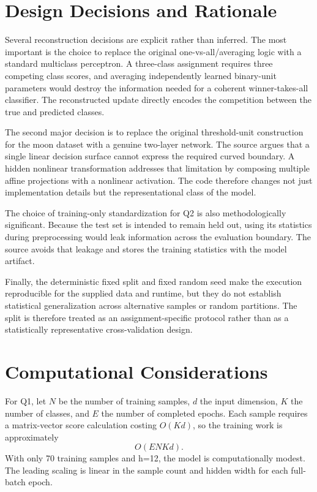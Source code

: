 \documentclass[11pt,a4paper]{article}
\begin{document}
\section{Design Decisions and Rationale}
Several reconstruction decisions are explicit rather than inferred. The most important is the choice to replace the original one-vs-all/averaging logic with a standard multiclass perceptron. A three-class assignment requires three competing class scores, and averaging independently learned binary-unit parameters would destroy the information needed for a coherent winner-takes-all classifier. The reconstructed update directly encodes the competition between the true and predicted classes.

The second major decision is to replace the original threshold-unit construction for the moon dataset with a genuine two-layer network. The source argues that a single linear decision surface cannot express the required curved boundary. A hidden nonlinear transformation addresses that limitation by composing multiple affine projections with a nonlinear activation. The code therefore changes not just implementation details but the representational class of the model.

The choice of training-only standardization for Q2 is also methodologically significant. Because the test set is intended to remain held out, using its statistics during preprocessing would leak information across the evaluation boundary. The source avoids that leakage and stores the training statistics with the model artifact.

Finally, the deterministic fixed split and fixed random seed make the execution reproducible for the supplied data and runtime, but they do not establish statistical generalization across alternative samples or random partitions. The split is therefore treated as an assignment-specific protocol rather than as a statistically representative cross-validation design.

\section{Computational Considerations}
For Q1, let \(N\) be the number of training samples, \(d\) the input dimension, \(K\) the number of classes, and \(E\) the number of completed epochs. Each sample requires a matrix-vector score calculation costing \(O(Kd)\), so the training work is approximately
\begin{equation}
    O(ENKd).
\end{equation}
With only 70 training samples and h=12, the model is computationally modest. The leading scaling is linear in the sample count and hidden width for each full-batch epoch.
\end{document}
